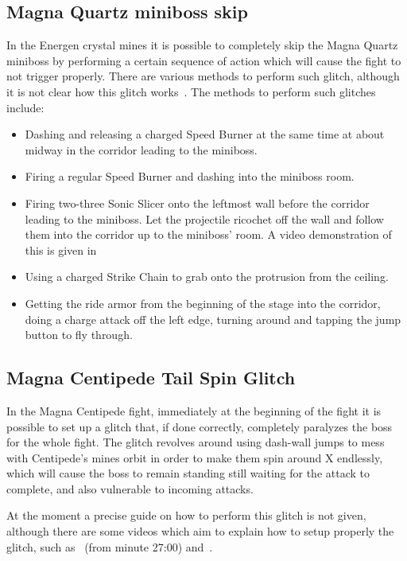 \subsection{Magna Quartz miniboss skip}\label{ssect:Quartz_skip}
In the Energen crystal mines it is possible to completely skip the Magna Quartz miniboss by performing a certain sequence of action which will cause the fight to not trigger properly. There are various methods to perform such glitch, although it is not clear how this glitch works~\cite{rta:x2}.
The methods to perform such glitches include:
\begin{itemize}
	\item Dashing and releasing a charged Speed Burner at the same time at about midway in the corridor leading to the miniboss.
	\item Firing a regular Speed Burner and dashing into the miniboss room.
	\item Firing two-three Sonic Slicer onto the leftmost wall before the corridor leading to the miniboss. Let the projectile ricochet off the wall and follow them into the corridor up to the miniboss' room. A video demonstration of this is given in 
	\item Using a charged Strike Chain to grab onto the protrusion from the ceiling.
	\item Getting the ride armor from the beginning of the stage into the corridor, doing a charge attack off the left edge, turning around and tapping the jump button to fly through.
\end{itemize}


\subsection{Magna Centipede Tail Spin Glitch}
In the Magna Centipede fight, immediately at the beginning of the fight it is possible to set up a glitch that, if done correctly, completely paralyzes the boss for the whole fight. The glitch revolves around using dash-wall jumps to mess with Centipede's mines orbit in order to make them spin around X endlessly, which will cause the boss to remain standing still waiting for the attack to complete, and also vulnerable to incoming attacks. 

At the moment a precise guide on how to perform this glitch is not given, although there are some videos which aim to explain how to setup properly the glitch, such as~\cite{video:tail_spin_1} (from minute 27:00) and~\cite{video:tail_spin_2}.

